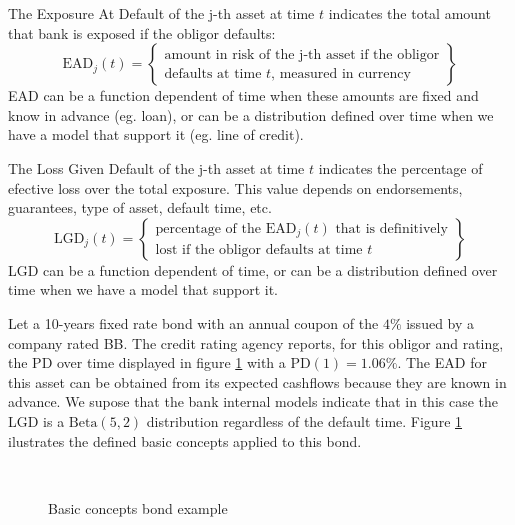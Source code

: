 \documentclass[11pt,fleqn]{book} %
\begin{document}
\begin{definition}
	The Exposure At Default of the j-th asset at time $t$ indicates 
	the total amount that bank is exposed if the obligor defaults:
	\begin{displaymath}
		\text{EAD}_j(t) = \left\{
		\begin{array}{c}
			\text{amount in risk of the j-th asset if the obligor} \\
			\text{defaults at time $t$, measured in currency}
		\end{array}
		\right\}
	\end{displaymath}
	EAD can be a function dependent of time when these amounts are
	fixed and know in advance (eg. loan), or can be a distribution
	defined over time when we have a model that support it 
	(eg. line of credit).
\end{definition}

\begin{definition}
	The Loss Given Default of the j-th asset at time $t$ indicates 
	the percentage of efective loss over the total exposure. This
	value depends on endorsements, guarantees, type of asset, 
	default time, etc.
	\begin{displaymath}
		\text{LGD}_j(t) = \left\{
		\begin{array}{c}
			\text{percentage of the $\text{EAD}_j(t)$ that is definitively} \\
			\text{lost if the obligor defaults at time $t$}
		\end{array}
		\right\}
	\end{displaymath}
	LGD can be a function dependent of time, or can be a distribution
	defined over time when we have a model that support it.
\end{definition}

\begin{example}[Bond]
Let a 10-years fixed rate bond with an annual coupon of the
$4\%$ issued by a company rated BB. The credit rating agency 
reports, for this obligor and rating, the PD over time displayed 
in figure \ref{figure:bond} with a $\text{PD}(1)=1.06\%$. 
The EAD for this asset can be obtained from its expected cashflows 
because they are known in advance. We supose that the bank 
internal models indicate that in this case the LGD is a 
$\text{Beta}(5,2)$ distribution regardless of the default time.
Figure \ref{figure:bond} ilustrates the defined basic concepts 
applied to this bond.
\begin{figure}[h!]
\centering
{}
\\
\caption{Basic concepts bond example}
\label{figure:bond} 
\end{figure}
\end{example}
\end{document}
